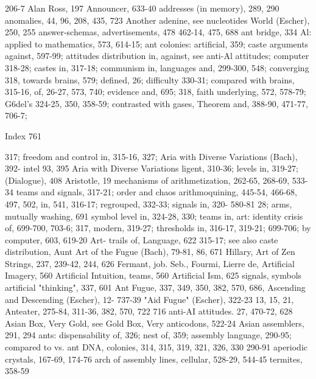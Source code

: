 206-7                                             Alan Ross, 197 Announcer, 633-40
addresses (in memory), 289, 290                   anomalies, 44, 96, 208, 435, 723 Another
adenine, see nucleotides                          World (Escher), 250, 255 answer-schemas,
advertisements, 478                               462-14, 475, 688 ant bridge, 334
Al: applied to mathematics, 573, 614-15;          ant colonies: artificial, 359; caste
arguments against, 597-99; attitudes              distribution in,
against, see anti-Al attitudes; computer          318-28; castes in, 317-18; communism in,
languages and, 299-300, 548; converging           318,
towards brains, 579; defined, 26; difficulty      330-31; compared with brains, 315-16,
of, 26-27, 573, 740; evidence and, 695;           318,
faith underlying, 572, 578-79; G6del's            324-25, 350, 358-59; contrasted with gases,
Theorem and, 388-90, 471-77, 706-7;


Index                                                                                      761

317; freedom and control in, 315-16, 327;     Aria with Diverse Variations (Bach), 392-
intel                                         93, 395 Aria with Diverse Variations
ligent, 310-36; levels in, 319-27;            (Dialogue), 408 Aristotle, 19
mechanisms of                                 arithmetization, 262-65, 268-69, 533-34
teams and signals, 317-21; order and chaos    arithmoquining, 445-54, 466-68, 497, 502,
in,                                           541,
316-17; regrouped, 332-33; signals in, 320-   580-81
28;                                           arms, mutually washing, 691
symbol level in, 324-28, 330; teams in,       art: identity crisis of, 699-700, 703-6;
317,                                          modern,
319-27; thresholds in, 316-17, 319-21;        699-706; by computer, 603, 619-20 Art-
trails of,                                    Language, 622
315-17; see also caste distribution, Aunt     Art of the Fugue (Bach), 79-81, 86, 671
Hillary,                                      Art of Zen Strings, 237, 239-42, 244, 626
Fermant, job. Seb., Fourmi, Lierre de,        Artificial Imagery, 560 Artificial Intuition,
teams,                                        560 Artificial Ism, 625
signals, symbols                              artificial "thinking", 337, 601
Ant Fugue, 337, 349, 350, 382, 570, 686,      Ascending and Descending (Escher), 12-
737-39 "Aid Fugue" (Escher), 322-23           13, 15, 21,
Anteater, 275-84, 311-36, 382, 570, 722       716
anti-AI attitudes. 27, 470-72, 628            Asian Box, Very Gold, see Gold Box, Very
anticodons, 522-24                            Asian assemblers, 291, 294
ants: dispensability of, 326; nest of, 359;   assembly language, 290-95; compared to
vs. ant                                       DNA,
colonies, 314, 315, 319, 321, 326, 330        290-91
aperiodic crystals, 167-69, 174-76 arch of    assembly lines, cellular, 528-29, 544-45
termites, 358-59

